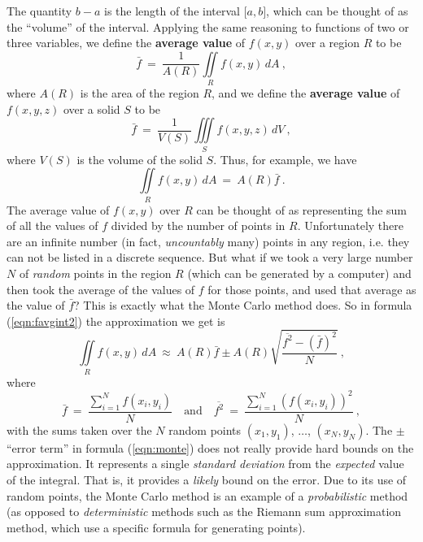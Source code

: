 The quantity $b-a$ is the length of the interval $\lbrack a,b \rbrack$, which can be thought of as the ``volume'' of
the interval. Applying the same reasoning to functions of two or three variables, we define the \textbf{average
value} of $f(x,y)$ over a region $R$ to be
\begin{equation}\label{eqn:favg2}
 \bar{f} ~=~ \frac{1}{A(R)}\iint\limits_{R} f(x,y)\,dA ~,
\end{equation}
where $A(R)$ is the area of the region $R$, and we define the \textbf{average
value} of $f(x,y,z)$ over a solid $S$ to be
\begin{equation}\label{eqn:favg3}
 \bar{f} ~=~ \frac{1}{V(S)}\iiint\limits_{S} f(x,y,z)\,dV ~,
\end{equation}
where $V(S)$ is the volume of the solid $S$. Thus, for example, we have
\begin{equation}\label{eqn:favgint2}
 \iint\limits_{R} f(x,y)\,dA ~=~ A(R)\bar{f} ~.
\end{equation}
The average value of $f(x,y)$ over $R$ can be thought of as representing the sum of all the values of $f$ divided by
the number of points in $R$. Unfortunately there are an infinite number (in fact, \emph{uncountably} many) points
in any region, i.e. they can not be listed in a discrete sequence. But what if we took a
very large number $N$ of \emph{random} points in the region $R$ (which can be generated by a computer) and then took the
average of the values of $f$ for those points, and used that
average as the value of $\bar{f}$? This is exactly what the Monte Carlo method does. So in formula (\ref{eqn:favgint2})
the approximation we get is
\begin{equation}\label{eqn:monte}
 \iint\limits_{R} f(x,y)\,dA ~\approx~ A(R)\bar{f} \pm A(R)\sqrt{\frac{\overline{f^2} - (\bar{f})^2}{N}} ~,
\end{equation}
where
\begin{equation}
 \bar{f} ~=~ \frac{\sum_{i=1}^N f(x_i,y_i)}{N} \quad \text{and} \quad \overline{f^2} ~=~
 \frac{\sum_{i=1}^N (f(x_i,y_i))^2}{N} ~,
\end{equation}
with the sums taken over the $N$ random points $(x_1,y_1)$, $\ldots$, $(x_N,y_N)$.
The $\pm$ ``error term'' in formula (\ref{eqn:monte}) does not really provide
hard bounds on the approximation. It represents a single \emph{standard deviation} from the \emph{expected} value of the
integral. That is, it provides a \emph{likely} bound on the error. Due to its use of random points, the Monte Carlo
method is an example of a \emph{probabilistic} method (as opposed to \emph{deterministic} methods such as the Riemann sum approximation method, which use a specific formula for generating points).

